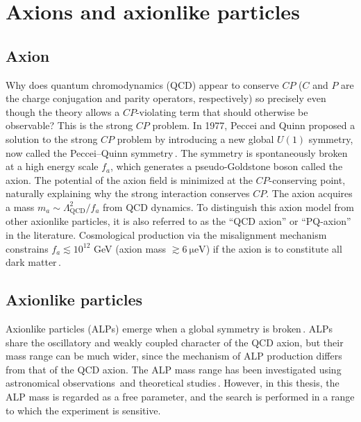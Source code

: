 \section{Axions and axionlike particles}\label{sec:intro:axions}
\subsection{Axion}

Why does quantum chromodynamics (QCD) appear to conserve $CP$ ($C$ and $P$ are the charge conjugation and parity operators, respectively) so precisely even though the theory allows a $CP$-violating term that should otherwise be observable?
This is the strong $CP$ problem.
In 1977, Peccei and Quinn proposed a solution to the strong $CP$ problem by introducing a new global $U(1)$ symmetry, now called the Peccei--Quinn symmetry\,\cite{PecceiQuinn1977_CPConservation_PRL,PecceiQuinn1977_ConstraintsCP_PRD}.
The symmetry is spontaneously broken at a high energy scale $f_a$, which generates a pseudo-Goldstone boson called the axion.
The potential of the axion field is minimized at the $CP$-conserving point, naturally explaining why the strong interaction conserves $CP$.
The axion acquires a mass $m_a \sim \Lambda_\mathrm{QCD}^2/f_a$ from QCD dynamics.
To distinguish this axion model from other axionlike particles, it is also referred to as the ``QCD axion'' or ``PQ-axion'' in the literature.
Cosmological production via the misalignment mechanism constrains $f_a \lesssim 10^{12}$ GeV (axion mass $\gtrsim \SI{6}{\micro\electronvolt}$) if the axion is to constitute all dark matter\,\cite{diCortona2016_QCDAxionPrecisely}.

\subsection{Axionlike particles}\label{sec:intro:ALP}

Axionlike particles (ALPs) emerge when a global symmetry is broken\,\cite{Weinberg1978_NewLightBoson,Wilczek1978_StrongPTInvariance, Kim1979_WeakInteractionSinglet, Shifman1980_ConfinementCP, Dine1981_HarmlessAxion, Zhitnitsky1980_WeinbergCP}.
ALPs share the oscillatory and weakly coupled character of the QCD axion, but their mass range can be much wider, since the mechanism of ALP production differs from that of the QCD axion.
The ALP mass range has been investigated using astronomical observations\,\cite{Marsh2016_AxionCosmology} and theoretical studies\,\cite{Zhitnitsky1980_WeinbergCP}.
However, in this thesis, the ALP mass is regarded as a free parameter, and the search is performed in a range to which the experiment is sensitive.

